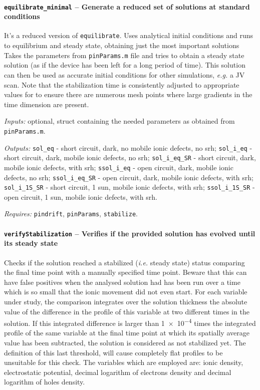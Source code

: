 \paragraph{\texttt{equilibrate\_minimal} -- Generate a reduced set of solutions at standard conditions}
It's a reduced version of \texttt{equilibrate}. 
Uses analytical initial conditions and runs to equilibrium and steady state, obtaining just the most important solutions
 Takes the parameters from \texttt{pinParams.m} file and tries
 to obtain a steady state solution (as if the device has been left for
 a long period of time). This solution can then be used as accurate
 initial conditions for other simulations, \textsl{e.g.} a JV scan.
 Note that the stabilization time is consistently adjusted to appropriate values for to
 ensure there are numerous mesh points where large gradients in the time
 dimension are present.
 
\textit{Inputs:} optional, struct containing the needed parameters as obtained
     from \texttt{pinParams.m}.
     
\textit{Outputs:} \texttt{sol\_eq} - short circuit, dark, no mobile ionic defects, no \gls{srh};
   \texttt{sol\_i\_eq} - short circuit, dark, mobile ionic defects, no \gls{srh};
   \texttt{sol\_i\_eq\_SR} - short circuit, dark, mobile ionic defects, with \gls{srh};
   \texttt{ssol\_i\_eq} - open circuit, dark, mobile ionic defects, no \gls{srh};
   \texttt{ssol\_i\_eq\_SR} - open circuit, dark, mobile ionic defects, with \gls{srh};
   \texttt{sol\_i\_1S\_SR} - short circuit, 1 sun, mobile ionic defects, with \gls{srh};
   \texttt{ssol\_i\_1S\_SR} - open circuit, 1 sun, mobile ionic defects, with \gls{srh}.

\textit{Requires:} \texttt{pindrift}, \texttt{pinParams}, \texttt{stabilize}.


		\paragraph{\texttt{verify\-Stabilization} -- Verifies if the provided solution has evolved until its steady state}\label{verifyStabilization}
Checks if the solution reached a stabilized (\textsl{i.e.} steady state) status comparing the final time point with a manually specified time point. Beware that this can have false positives when the analysed solution had
 has been run over a time which is so small that the ionic movement did not even start.
 For each variable under study, the comparison integrates over the solution thickness the absolute value of the difference in the profile of this variable at two different times in the solution.
 If this integrated difference is larger than \num{1e-4} times the integrated profile of the same variable at the final time point at which its spatially average value has been subtracted, the solution is considered as not stabilized yet.
 The definition of this last threshold, will cause completely flat profiles to be unsuitable for this check.
 The variables which are employed are: ionic density, electrostatic potential, decimal logarithm of electrons density and decimal logarithm of holes density.
 
